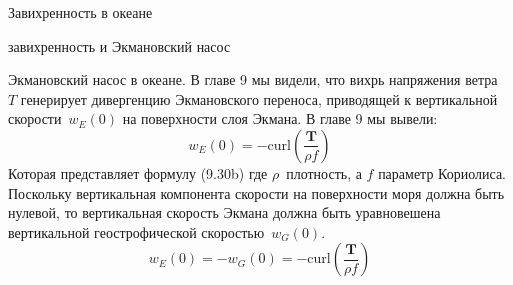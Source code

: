 \begin{chapter}{Завихренность в океане}
\begin{section}{завихренность и Экмановский насос}
\begin{paragraph}{Экмановский насос в океане.}
В главе 9 мы видели, что вихрь напряжения ветра~$T$ генерирует
дивергенцию Экмановского переноса, приводящей к вертикальной
скорости~$w_E (0)$ на поверхности слоя Экмана. В главе 9 мы вывели:
\begin{equation}
  w_E (0) = -\text{curl}\left(\frac{\mathbf{T}}{\rho f} \right)
\end{equation}
Которая представляет формулу (9.30b) где $\rho$~плотность, а $f$ параметр
Кориолиса. Поскольку вертикальная компонента скорости на поверхности
моря должна быть нулевой, то вертикальная скорость Экмана должна быть
уравновешена вертикальной геострофической скоростью~$w_G(0)$.
\begin{equation}
 w_E (0) = - w_G (0) = -\text{curl}\left(\frac{\mathbf{T}}{\rho f} \right)
\end{equation}
%


\end{paragraph}
\end{section}
\end{chapter}
